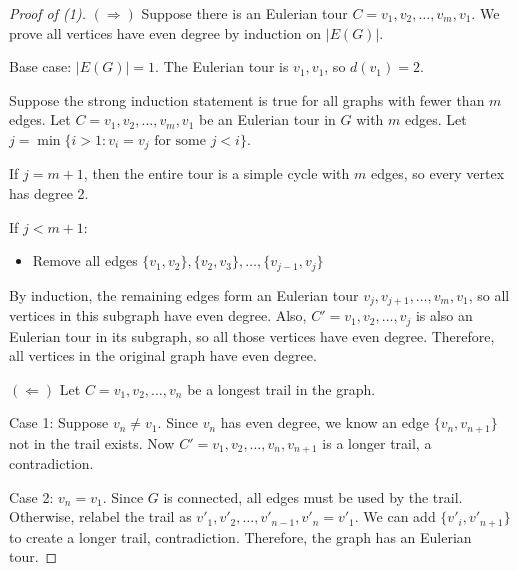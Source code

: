 \documentclass{article}
\theoremstyle{definition}
\begin{document}
\begin{proof}[Proof of (1)]
$(\Rightarrow)$ Suppose there is an Eulerian tour $C = v_1, v_2, \ldots, v_m, v_1$. We prove all vertices have even degree by induction on $|E(G)|$.

Base case: $|E(G)| = 1$. The Eulerian tour is $v_1, v_1$, so $d(v_1) = 2$.

Suppose the strong induction statement is true for all graphs with fewer than $m$ edges.
Let $C = v_1, v_2, \ldots, v_m, v_1$ be an Eulerian tour in $G$ with $m$ edges.
Let $j = \min\{i > 1 : v_i = v_j \text{ for some } j < i\}$.

If $j = m+1$, then the entire tour is a simple cycle with $m$ edges, so every vertex has degree 2.

If $j < m+1$:
\begin{itemize}
\item Remove all edges $\{v_1, v_2\}, \{v_2, v_3\}, \ldots, \{v_{j-1}, v_j\}$
\end{itemize}

By induction, the remaining edges form an Eulerian tour $v_j, v_{j+1}, \ldots, v_m, v_1$, so all vertices in this subgraph have even degree.
Also, $C' = v_1, v_2, \ldots, v_j$ is also an Eulerian tour in its subgraph, so all those vertices have even degree.
Therefore, all vertices in the original graph have even degree.

$(\Leftarrow)$ Let $C = v_1, v_2, \ldots, v_n$ be a longest trail in the graph.

Case 1: Suppose $v_n \neq v_1$.
Since $v_n$ has even degree, we know an edge $\{v_n, v_{n+1}\}$ not in the trail exists.
Now $C' = v_1, v_2, \ldots, v_n, v_{n+1}$ is a longer trail, a contradiction.

Case 2: $v_n = v_1$.
Since $G$ is connected, all edges must be used by the trail.
Otherwise, relabel the trail as $v'_1, v'_2, \ldots, v'_{n-1}, v'_n = v'_1$.
We can add $\{v'_i, v'_{n+1}\}$ to create a longer trail, contradiction.
Therefore, the graph has an Eulerian tour.
\end{proof}
\end{document}

